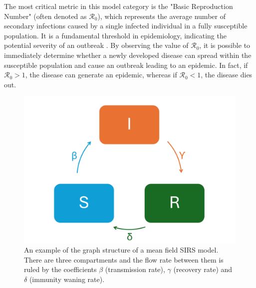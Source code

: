 The most critical metric in this model category is the "Basic Reproduction Number" (often denoted as $\mathcal{R}_0$), which represents the average number of secondary infections caused by a single infected individual in a fully susceptible population. It is a fundamental threshold in epidemiology, indicating the potential severity of an outbreak \cite{Hernandez_Vargas_2022}. By observing the value of $\mathcal{R}_0$, it is possible to immediately determine whether a newly developed disease can spread within the susceptible population and cause an outbreak leading to an epidemic. In fact, if $\mathcal{R}_0 > 1$, the disease can generate an epidemic, whereas if $\mathcal{R}_0 < 1$, the disease dies out.
\begin{figure}[]
	\centering
	\includegraphics[width=0.65\linewidth]{0_introduction/images_introduction/SIRS_figure_compartmental}
	\caption[SIRS example]{An example of the graph structure of a mean field SIRS model. There are three compartments and the flow rate between them is ruled by the coefficients $\beta$ (transmission rate), $\gamma$ (recovery rate) and $\delta$ (immunity waning rate).}
	\label{fig:sirsfigurecompartmental}
\end{figure}


